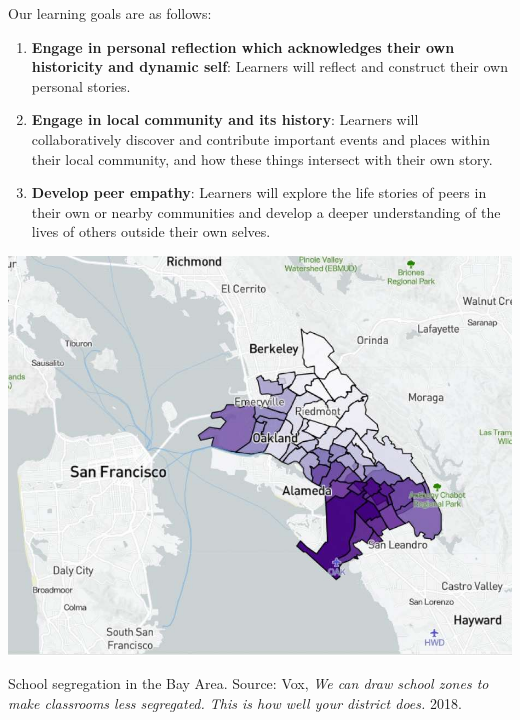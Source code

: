\documentclass{sigchi-ext}
\begin{document}
Our learning goals are as follows:
\begin{enumerate}\compresslist
	\item \textbf{Engage in personal reflection which acknowledges their own historicity and dynamic self}: Learners will reflect and construct their own personal stories.
	\item \textbf{Engage in local community and its history}: Learners will collaboratively discover and contribute important events and places within their local community, and how these things intersect with their own story.
	\item \textbf{Develop peer empathy}: Learners will explore the life stories of peers in their own or nearby communities and develop a deeper understanding of the lives of others outside their own selves.
\end{enumerate}

\begin{marginfigure}[-25pc]
  \begin{minipage}{\marginparwidth}
    \centering
    \includegraphics[width=0.9\marginparwidth]{figures/map}
    \caption{School segregation in the Bay Area. Source: Vox, \textit{We can draw school zones to make classrooms less segregated. This is how well your district does.} 2018.}~\label{fig:bay-area-map}
  \end{minipage}
\end{marginfigure}
\end{document}
